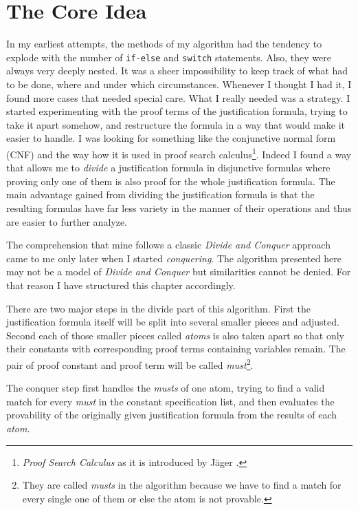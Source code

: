 \section{The Core Idea}
In my earliest attempts, the methods of my algorithm had the tendency to explode with the number of \texttt{if-else} and \texttt{switch} statements. Also, they were always very deeply nested. It was a sheer impossibility to keep track of what had to be done, where and under which circumstances. Whenever I thought I had it, I found more cases that needed special care. What I really needed was a strategy. I started experimenting with the proof terms of the justification formula, trying to take it apart somehow, and restructure the formula in a way that would make it easier to handle. I was looking for something like the conjunctive normal form (CNF) and the way how it is used in proof search calculus\footnote{\emph{Proof Search Calculus} as it is introduced by Jäger \cite{jaeg}.}. Indeed I found a way that allows me to \emph{divide} a justification formula in disjunctive formulas where proving only one of them is also proof for the whole justification formula. The main advantage gained from dividing the justification formula is that the resulting formulas have far less variety in the manner of their operations and thus are easier to further analyze.

The comprehension that mine follows a classic \emph{Divide and Conquer} approach came to me only later when I started \emph{conquering}. The algorithm presented here may not be a model of \emph{Divide and Conquer} but similarities cannot be denied. For that reason I have structured this chapter accordingly.

\medskip

There are two major steps in the divide part of this algorithm. First the justification formula itself will be split into several smaller pieces and adjusted. Second each of those smaller pieces called \emph{atoms} is also taken apart so that only their constants with corresponding proof terms containing variables remain. The pair of proof constant and proof term will be called \emph{must}\footnote{They are called \emph{musts} in the algorithm because we have to find a match for every single one of them or else the atom is not provable.}.

The conquer step first handles the \emph{musts} of one atom, trying to find a valid match for every \emph{must} in the constant specification list, and then evaluates the provability of the originally given justification formula from the results of each \emph{atom}.

